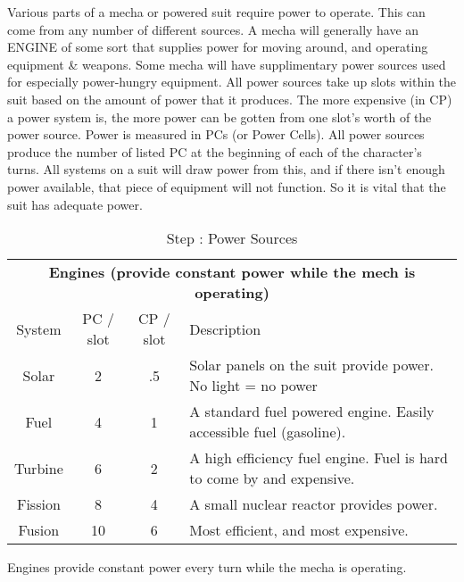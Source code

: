 Various parts of a mecha or powered suit require power to operate.  This can come from any number of different sources.  A mecha will generally have an ENGINE of some sort that supplies power for moving around, and operating equipment \& weapons.  Some mecha will have supplimentary power sources used for especially power-hungry equipment.  All power sources take up slots within the suit based on the amount of power that it produces.  The more expensive (in CP) a power system is, the more power can be gotten from one slot's worth of the power source. Power is measured in PCs (or Power Cells).  All power sources produce the number of listed PC at the beginning of each of the character's turns.  All systems on a suit will draw power from this, and if there isn't enough power available, that piece of equipment will not function.  So it is vital that the suit has adequate power.

\begin{table}[htb]
\begin{center}
\begin{tabular}{c|c|c|p{3.5in}}
\multicolumn{4}{c}{\textbf{Engines (provide constant power while the mech is operating)}} \\
System & PC / slot & CP / slot & Description \\
\hline
\hline
Solar & 2 & .5 & Solar panels on the suit provide power.  No light = no power \\ \hline
Fuel & 4 & 1 & A standard fuel powered engine.  Easily accessible fuel (gasoline). \\ \hline
Turbine & 6 & 2 & A high efficiency fuel engine.  Fuel is hard to come by and expensive. \\ \hline
Fission & 8 & 4 & A small nuclear reactor provides power. \\ \hline
Fusion & 10 & 6 & Most efficient, and most expensive. \\ \hline
\end{tabular}
\caption{Step : Power Sources}
\end{center}
\end{table}
\addtocounter{MechaSteps}{1}

Engines provide constant power every turn while the mecha is operating.

